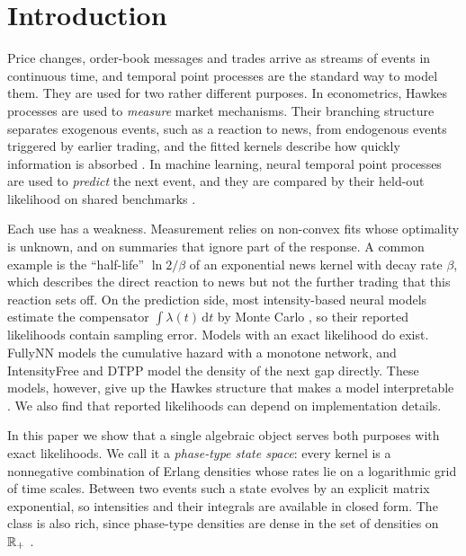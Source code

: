 \section{Introduction}\label{sec:intro}

Price changes, order-book messages and trades arrive as streams of events in continuous time,
and temporal point processes are the standard way to model them. They are used for two rather
different purposes. In econometrics, Hawkes processes \citep{hawkes1971spectra} are used to
\emph{measure} market mechanisms. Their branching structure \citep{hawkes1974cluster} separates
exogenous events, such as
a reaction to news, from endogenous events triggered by earlier trading, and the fitted kernels
describe how quickly information is absorbed
\citep{hardiman2013critical,filimonov2012quantifying,rambaldi2015modeling}. In machine learning,
neural temporal point processes are used to \emph{predict} the next event, and they are compared
by their held-out likelihood on shared benchmarks
\citep{du2016recurrent,mei2017neural,zuo2020transformer,shchur2020intensity,xue2024easytpp,chang2025deep}.

Each use has a weakness. Measurement relies on non-convex fits whose optimality is unknown, and
on summaries that ignore part of the response. A common example is the ``half-life''
$\ln 2/\beta$ of an exponential news kernel with decay rate $\beta$, which describes the direct
reaction to news but not the further trading that this reaction sets off. On the prediction
side, most intensity-based neural models estimate the compensator $\int\lambda(t)\,\mathrm{d}t$
by Monte Carlo \citep{mei2017neural,zuo2020transformer,yang2022transformer,chang2025deep,boyd2025hyper}, so
their reported likelihoods contain sampling error. Models with an exact likelihood do exist.
FullyNN \citep{omi2019fully} models the cumulative hazard with a monotone network, and
IntensityFree \citep{shchur2020intensity} and DTPP \citep{panos2024decomposable} model the density
of the next gap directly. These models, however, give up the Hawkes structure that makes a model
interpretable \citep{shchur2021neural}.
We also find that reported likelihoods can depend on implementation details.

In this paper we show that a single algebraic object serves both purposes with exact
likelihoods. We call it a \emph{phase-type state space}: every kernel is a nonnegative
combination of Erlang densities whose rates lie on a logarithmic grid of time scales. Between
two events such a state evolves by an explicit matrix exponential, so intensities and their
integrals are available in closed form. The class is also rich, since phase-type densities are
dense in the set of densities on $\mathbb{R}_+$ \citep{asmussen1996fitting,lee2010modeling}.

